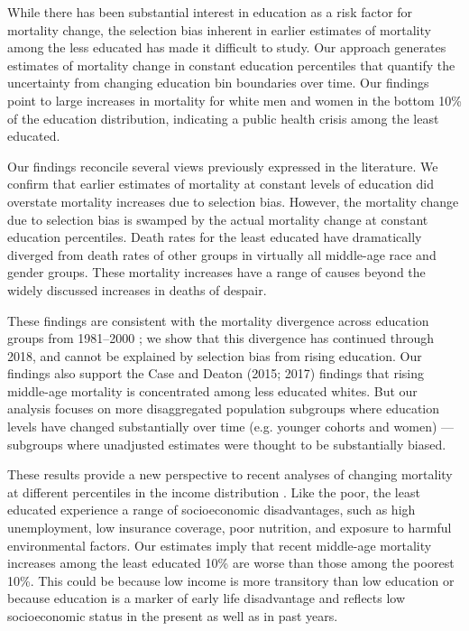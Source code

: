\documentclass[12pt,letterpaper]{article}
\numberwithin{equation}{section}
\begin{document}
While there has been substantial interest in education as a risk factor for mortality change, the selection bias inherent in earlier estimates of mortality among the less educated has made it difficult to study. Our approach generates estimates of mortality change in constant education percentiles that quantify the uncertainty from changing education bin boundaries over time. Our findings point to large increases in mortality for white men and women in the bottom 10\% of the education distribution, indicating a public health crisis among the least educated.

Our findings reconcile several views previously expressed in the literature. We confirm that earlier estimates of mortality at constant levels of education did overstate mortality increases due to selection bias. However, the mortality change due to selection bias is swamped by the actual mortality change at constant education percentiles. Death rates for the least educated have dramatically diverged from death rates of other groups in virtually all middle-age race and gender groups. These mortality increases have a range of causes beyond the widely discussed increases in deaths of despair.

These findings are consistent with the mortality divergence across
education groups from 1981--2000 \citep{Meara2008}; we show that this
divergence has continued through 2018, and cannot be explained by
selection bias from rising education. Our findings also support the
Case and Deaton (2015; 2017) findings that rising middle-age mortality is concentrated among less educated whites. But our analysis focuses on more disaggregated population subgroups where education levels have changed substantially over time (e.g. younger cohorts and women) --- subgroups where unadjusted estimates were thought to be substantially biased.

These results provide a new perspective to recent analyses of changing mortality at different percentiles in the income distribution \citep{Cristia2009,Chetty2016b}. Like the poor, the least educated experience a range of socioeconomic disadvantages, such as high unemployment, low insurance coverage, poor nutrition, and exposure to harmful environmental factors. Our estimates imply that recent middle-age mortality increases among the least educated 10\% are worse than those among the poorest 10\%. This could be because low income is more transitory than low education or because education is a marker of early life disadvantage and reflects low socioeconomic status in the present as well as in past years.
\end{document}
